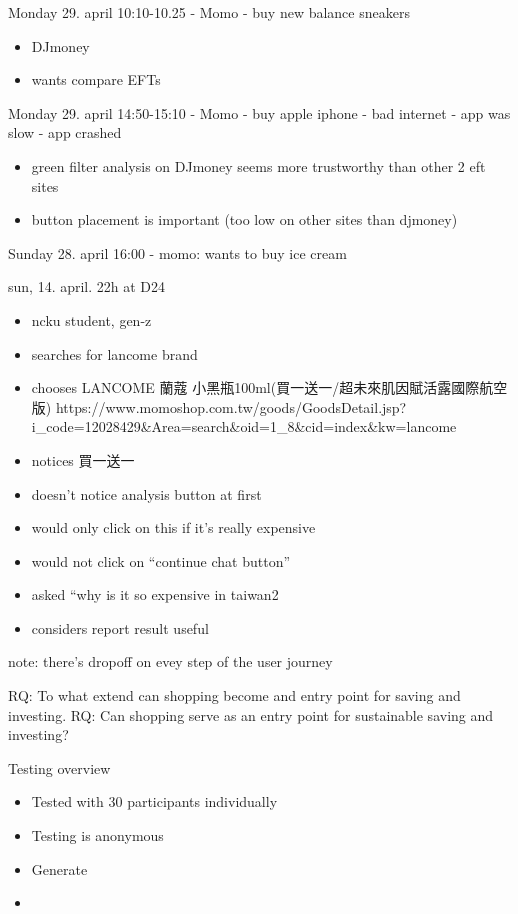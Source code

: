 \documentclass[
  letterpaper,
  DIV=11,
  numbers=noendperiod]{scrartcl}
\providecommand{\tightlist}{%
  \setlength{\itemsep}{0pt}\setlength{\parskip}{0pt}}\usepackage{longtable,booktabs,array}
\begin{document}
Monday 29. april 10:10-10.25 - Momo - buy new balance sneakers

\begin{itemize}
\tightlist
\item
  DJmoney
\item
  wants compare EFTs
\end{itemize}

Monday 29. april 14:50-15:10 - Momo - buy apple iphone - bad internet -
app was slow - app crashed

\begin{itemize}
\tightlist
\item
  green filter analysis on DJmoney seems more trustworthy than other 2
  eft sites
\item
  button placement is important (too low on other sites than djmoney)
\end{itemize}

Sunday 28. april 16:00 - momo: wants to buy ice cream

sun, 14. april. 22h at D24

\begin{itemize}
\tightlist
\item
  ncku student, gen-z
\item
  searches for lancome brand
\item
  chooses LANCOME 蘭蔻 小黑瓶100ml(買一送一/超未來肌因賦活露國際航空版)
  https://www.momoshop.com.tw/goods/GoodsDetail.jsp?i\_code=12028429\&Area=search\&oid=1\_8\&cid=index\&kw=lancome
\item
  notices 買一送一
\item
  doesn't notice analysis button at first
\item
  would only click on this if it's really expensive
\item
  would not click on ``continue chat button''
\item
  asked ``why is it so expensive in taiwan2
\item
  considers report result useful
\end{itemize}

note: there's dropoff on evey step of the user journey

RQ: To what extend can shopping become and entry point for saving and
investing. RQ: Can shopping serve as an entry point for sustainable
saving and investing?

Testing overview

\begin{itemize}
\tightlist
\item
  Tested with 30 participants individually
\item
  Testing is anonymous
\item
  Generate
\item
\end{itemize}
\end{document}
